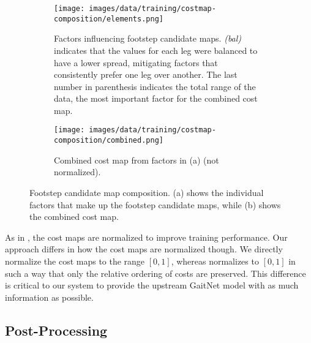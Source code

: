 \begin{figure}[H]
  \centering
  \begin{subfigure}[T]{0.65\textwidth}
    \centering
    \texttt{[image: images/data/training/costmap-composition/elements.png]}
    \caption{Factors influencing footstep candidate maps. \textit{(bal)}
      indicates that the values for each leg were balanced to have a
      lower spread, mitigating factors that consistently prefer one leg
      over another. The last number in parenthesis indicates the total
    range of the data, the most important factor for the combined cost map.}
    \label{fig:data-costmap-composition-elements}
  \end{subfigure}
  \hfill
  \begin{subfigure}[T]{0.3\textwidth}
    \centering
    \texttt{[image: images/data/training/costmap-composition/combined.png]}
    \caption{Combined cost map from factors in (a) (not normalized).}
    \label{fig:data-costmap-composition-combined}
  \end{subfigure}
  \hfill
  \caption{Footstep candidate map composition. (a) shows the individual
    factors that make up the footstep candidate maps, while (b) shows the
  combined cost map.}
  \label{fig:data-costmap-composition}
\end{figure}

As in \cite{bratta_contactnet_2024}, the cost maps are normalized to
improve training performance. Our approach differs in how the cost
maps are normalized though. We directly normalize the cost maps to
the range $[0, 1]$, whereas \cite{bratta_contactnet_2024} normalizes
to $[0,1]$ in such a way that only the relative ordering of costs are
preserved. This difference is critical to our system to provide the
upstream GaitNet model with as much information as possible.

\subsection{Post-Processing}

